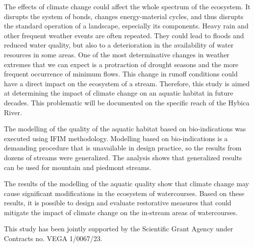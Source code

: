 \noindent

The effects of climate change could affect the whole spectrum of the ecosystem. It disrupts the system of bonds, changes energy-material cycles, and thus disrupts the standard operation of a landscape, especially its components. Heavy rain and other frequent weather events are often repeated. They could lead to floods and reduced water quality, but also to a deterioration in the availability of water resources in some areas. One of the most determinative changes in weather extremes that we can expect is a protraction of drought seasons and the more frequent occurrence of minimum flows. This change in runoff conditions could have a direct impact on the ecosystem of a stream. Therefore, this study is aimed at determining the impact of climate change on an aquatic habitat in future decades. This problematic will be documented on the specific reach of the Hybica River.

The modelling of the quality of the aquatic habitat based on bio-indications was executed using IFIM methodology. Modelling based on bio-indications is a demanding procedure that is unavailable in design practice, so the results from dozens of streams were generalized. The analysis shows that generalized results can be used for mountain and piedmont streams.

The results of the modelling of the aquatic quality show that climate change may cause significant modifications in the ecosystem of watercourses. Based on these results, it is possible to design and evaluate restorative measures that could mitigate the impact of climate change on the in-stream areas of watercourses.

This study has been jointly supported by the Scientific Grant Agency under Contracts no. VEGA 1/0067/23.

\newpage{}
{}
\begin{flushleft}





\end{flushleft}

